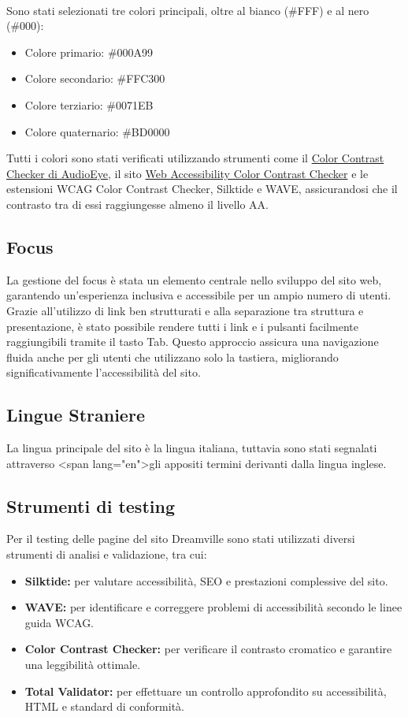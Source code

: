 \\
Sono stati selezionati tre colori principali, oltre al bianco (\#FFF) e al nero (\#000):
\begin{itemize}
    \item Colore primario: \#000A99
    \item Colore secondario: \#FFC300
    \item Colore terziario: \#0071EB
    \item Colore quaternario: \#BD0000
\end{itemize}
Tutti i colori sono stati verificati utilizzando strumenti come il \href{https://www.audioeye.com/color-contrast-checker/}{Color Contrast Checker di AudioEye}, il sito \href{https://accessibleweb.com/color-contrast-checker/}{Web Accessibility Color Contrast Checker} e le estensioni WCAG Color Contrast Checker, Silktide e WAVE, assicurandosi che il contrasto tra di essi raggiungesse almeno il livello AA.
\subsection{Focus}
La gestione del focus è stata un elemento centrale nello sviluppo del sito web, garantendo un’esperienza inclusiva e accessibile per un ampio numero di utenti. Grazie all’utilizzo di link ben strutturati e alla separazione tra struttura e presentazione, è stato possibile rendere tutti i link e i pulsanti facilmente raggiungibili tramite il tasto Tab. Questo approccio assicura una navigazione fluida anche per gli utenti che utilizzano solo la tastiera, migliorando significativamente l’accessibilità del sito.
\subsection{Lingue Straniere}
La lingua principale del sito è la lingua italiana, tuttavia sono stati segnalati attraverso \textless span lang="en"\textgreater gli appositi termini derivanti dalla lingua inglese.
\subsection{Strumenti di testing}
Per il testing delle pagine del sito Dreamville sono stati utilizzati diversi strumenti di analisi e validazione, tra cui:
\begin{itemize}
    \item \textbf{Silktide:} per valutare accessibilità, SEO e prestazioni complessive del sito.
    \item \textbf{WAVE:} per identificare e correggere problemi di accessibilità secondo le linee guida WCAG.
    \item \textbf{Color Contrast Checker:} per verificare il contrasto cromatico e garantire una leggibilità ottimale.
    \item \textbf{Total Validator:} per effettuare un controllo approfondito su accessibilità, HTML e standard di conformità.
\end{itemize}

